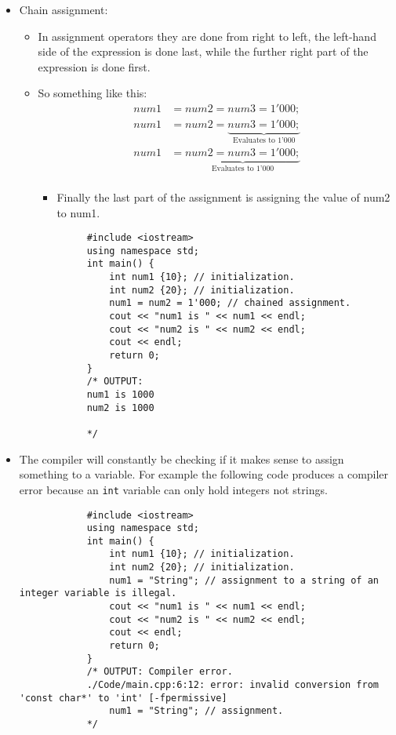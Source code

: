 \begin{itemize}
    \item Chain assignment: 
        \begin{itemize}
            \item In assignment operators they are done from right to left, the left-hand side of the expression is done last, while the further right part of the expression is done first.
            \item So something like this:
                \begin{align*}
                    num1 &= num2 = num3 = 1'000; \\ 
                    num1 &= num2 = \underbrace{num3 = 1'000;}_{\text{Evaluates to 1'000}} \\ 
                    num1 &= \underbrace{num2 = num3 = 1'000;}_{\text{Evaluates to 1'000}} \\ 
                \end{align*}
                \begin{itemize}
                    \item Finally the last part of the assignment is assigning the value of num2 to num1.
                \end{itemize}
        \end{itemize}
        \begin{verbatim}
            #include <iostream>
            using namespace std;
            int main() {
                int num1 {10}; // initialization.
                int num2 {20}; // initialization.
                num1 = num2 = 1'000; // chained assignment.
                cout << "num1 is " << num1 << endl;
                cout << "num2 is " << num2 << endl;
                cout << endl;
                return 0;
            } 
            /* OUTPUT: 
            num1 is 1000
            num2 is 1000

            */
        \end{verbatim}
    
    \item The compiler will constantly be checking if it makes sense to assign something to a variable. For example the following code produces a compiler error because an \texttt{int} variable can only hold integers not strings.
        \begin{verbatim}
            #include <iostream>
            using namespace std;
            int main() {
                int num1 {10}; // initialization.
                int num2 {20}; // initialization.
                num1 = "String"; // assignment to a string of an integer variable is illegal.
                cout << "num1 is " << num1 << endl;
                cout << "num2 is " << num2 << endl;
                cout << endl;
                return 0;
            } 
            /* OUTPUT: Compiler error.
            ./Code/main.cpp:6:12: error: invalid conversion from 'const char*' to 'int' [-fpermissive]    
                num1 = "String"; // assignment.
            */
        \end{verbatim}
    

\end{itemize}
